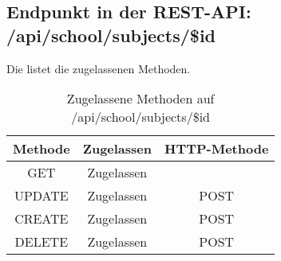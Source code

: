 \subsection{Endpunkt in der REST-API: /api/school/subjects/\$id}
Die  listet die zugelassenen Methoden. 

\begin{table}[!htbp]
	\begin{tabular}{|c|c|c|}
		\hline
			\textbf{Methode} & \textbf{Zugelassen} & \textbf{HTTP-Methode} \\ \hline
			GET & Zugelassen &  \\ \hline
			UPDATE & Zugelassen & POST \\ \hline 
			CREATE & Zugelassen & POST \\ \hline 
			DELETE & Zugelassen & POST \\ \hline
	\end{tabular}

		\caption{Zugelassene Methoden auf /api/school/subjects/\$id}
		\label{tab:end:rest:api:school:subjects:id:meth}
\end{table}